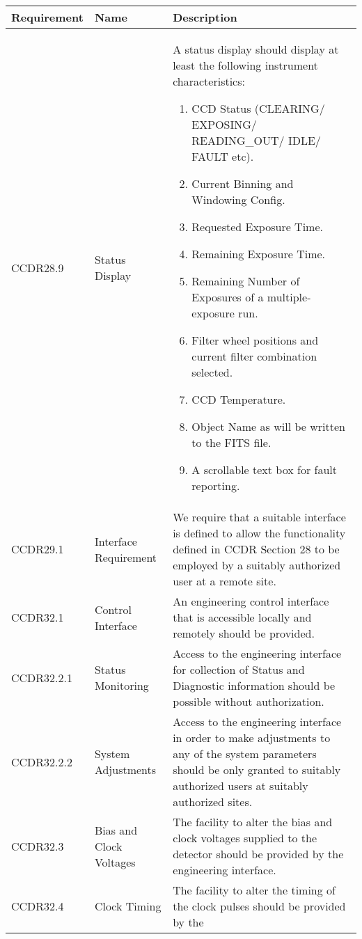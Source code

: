 \documentclass[10pt,a4paper]{article}
\begin{document}
\begin{table}[!h]
\begin{center}
\begin{tabular}{|l|l|p{25em}|}
\hline
{\bf Requirement} & {\bf Name} & {\bf Description} \\ \hline
CCDR28.9	& Status Display & A status display should display at least the following instrument characteristics:
		\begin{enumerate}
		\item CCD Status (CLEARING/ EXPOSING/ READING\_OUT/ IDLE/ FAULT etc).
		\item Current Binning and Windowing Config.
		\item Requested Exposure Time.
		\item Remaining Exposure Time.
		\item Remaining Number of Exposures of a multiple-exposure run.
		\item Filter wheel positions and current filter combination selected.
		\item CCD Temperature.
		\item Object Name as will be written to the FITS file.
		\item A scrollable text box for fault reporting.
		\end{enumerate}
		\\ \hline
CCDR29.1	& Interface Requirement & We require that a suitable interface is defined to allow
		the functionality defined in CCDR Section 28 
		to be employed by a suitably authorized user at a remote site.\\ \hline
CCDR32.1	& Control Interface & An engineering control interface that is accessible locally 
		and remotely should be provided.\\ \hline
CCDR32.2.1	& Status Monitoring & Access to the engineering interface for collection of Status and
		Diagnostic information should be possible without authorization.\\ \hline
CCDR32.2.2	& System Adjustments & Access to the engineering interface in order to make
		adjustments to any of the system parameters should be only granted to
		suitably authorized users at suitably authorized sites.\\ \hline
CCDR32.3	& Bias and Clock Voltages & The facility to alter the bias and clock voltages supplied 
		to the detector should be provided by the engineering interface.\\ \hline
CCDR32.4	& Clock Timing & The facility to alter the timing of the clock pulses should be provided by the

\end{tabular}
\end{center}
\end{table}
\end{document}
